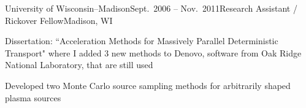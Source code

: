 \clearpage
\begin{rSubsection}{University of Wisconsin--Madison}{Sept.\ 2006 -- Nov.\ 2011}{Research Assistant / Rickover Fellow}{Madison, WI}
\item Dissertation: ``Acceleration Methods for Massively Parallel Deterministic Transport" where I added 3 new methods to Denovo, software from Oak Ridge National Laboratory, that are still used%
\item Developed two Monte Carlo source sampling methods for arbitrarily shaped plasma sources%
\end{rSubsection}





